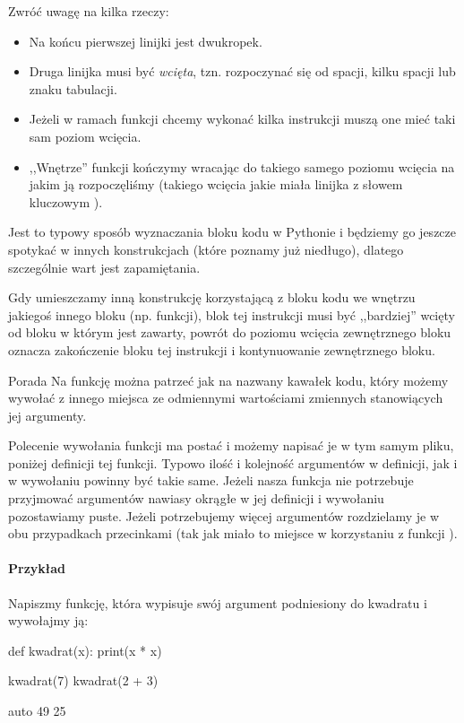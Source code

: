 \documentclass{pdfBooklets}
\begin{document}
\noindent
Zwróć uwagę na kilka rzeczy:
\begin{itemize}
	\item Na końcu pierwszej linijki jest dwukropek.
	\item Druga linijka musi być \emph{wcięta}, tzn. rozpoczynać się od spacji, kilku spacji lub znaku tabulacji.
	\item Jeżeli w ramach funkcji chcemy wykonać kilka instrukcji muszą one mieć taki sam poziom wcięcia.
	\item ,,Wnętrze'' funkcji kończymy wracając do takiego samego poziomu wcięcia na jakim ją rozpoczęliśmy
	      (takiego wcięcia jakie miała linijka z słowem kluczowym ).
\end{itemize}\vspace{-4pt}
Jest to typowy sposób wyznaczania bloku kodu w Pythonie i będziemy go jeszcze spotykać w innych konstrukcjach (które poznamy już niedługo), dlatego szczególnie wart jest zapamiętania.

Gdy umieszczamy inną konstrukcję korzystającą z bloku kodu we wnętrzu jakiegoś innego bloku (np. funkcji), blok tej instrukcji musi być ,,bardziej'' wcięty od bloku w którym jest zawarty,
powrót do poziomu wcięcia zewnętrznego bloku oznacza zakończenie bloku tej instrukcji i kontynuowanie zewnętrznego bloku.

\begin{ProTip}{Porada}
Na funkcję można patrzeć jak na nazwany kawałek kodu, który możemy wywołać z innego miejsca ze odmiennymi wartościami zmiennych stanowiących jej argumenty.
\end{ProTip}

Polecenie wywołania funkcji ma postać  i możemy napisać je w tym samym pliku, poniżej definicji tej funkcji.
Typowo ilość i kolejność argumentów w definicji, jak i w wywołaniu powinny być takie same.
Jeżeli nasza funkcja nie potrzebuje przyjmować argumentów nawiasy okrągłe w jej definicji i wywołaniu pozostawiamy puste.
Jeżeli potrzebujemy więcej argumentów rozdzielamy je w obu przypadkach przecinkami (tak jak miało to miejsce w korzystaniu z funkcji ).

\paragraph{Przykład}
Napiszmy funkcję, która wypisuje swój argument podniesiony do kwadratu i wywołajmy ją:

\begin{CodeFrame}[python]{.5\textwidth}
def kwadrat(x):
  print(x * x)

kwadrat(7)
kwadrat(2 + 3)
\end{CodeFrame}
\begin{CodeFrame}{auto}
49
25
\end{CodeFrame}
\end{document}
